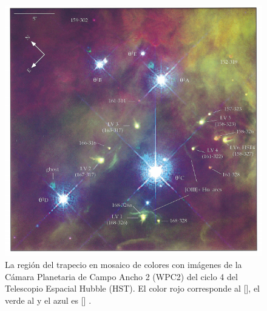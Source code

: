 \begin{figure}
  \centering
  \ContinuedFloat
  \captionsetup{list=off,format=cont}
  \includegraphics[width=0.7\linewidth]{./Figures/bally-trapezium}
  \caption{La región del trapecio en mosaico de colores con imágenes de la Cámara Planetaria de Campo Ancho 2 (WPC2) del ciclo 4 del Telescopio Espacial Hubble (HST). El color rojo corresponde al [], el verde al  y el azul es [] \citep{Bally:1998}.}
  \label{fig:prop-bally-robberto-2}
\end{figure}


